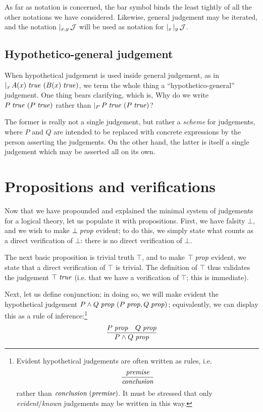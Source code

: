 \documentclass[main.tex]{subfiles}
\begin{document}
As far as notation is concerned, the bar symbol binds the least
tightly of all the other notations we have considered. Likewise,
general judgement may be iterated, and the notation
$\lvert_{x,y}\,\mathcal{J}$ will be used as notation for
$\lvert_{x}\,\lvert_{y}\,\mathcal{J}$.

\subsection{Hypothetico-general judgement}

When hypothetical judgement is used inside general judgement, as in
$\lvert_{x}\,A(x)\;\mathit{true}\ (B(x)\;\mathit{true})$, we term the whole
thing a ``hypothetico-general'' judgement. One thing bears clarifying,
which is, Why do we write $P\;\mathit{true}\ (P\;\mathit{true})$ rather than
$\lvert_{P}\,P\;\mathit{true}\ (P\;\mathit{true})$?

The former is really not a single judgement, but rather a \emph{scheme} for
judgements, where $P$ and $Q$ are intended to be replaced with concrete
expressions by the person asserting the judgements. On the other hand, the
latter is itself a single judgement which may be asserted all on its own.

\section{Propositions and verifications}
Now that we have propounded and explained the minimal system of judgements for
a logical theory, let us populate it with propositions. First, we have falsity
$\bot$, and we wish to make $\bot\;\mathit{prop}$ evident; to do this, we simply state
what counts as a direct verification of $\bot$: there is no
direct verification of $\bot$.

The next basic proposition is trivial truth $\top$, and to make
$\top\;\mathit{prop}$ evident, we state that a direct verification of $\top$
is trivial. The definition of $\top$ thus validates the judgement
$\top\;\mathit{true}$ (i.e. that we have a verification of $\top$; this
is immediate).

Next, let us define conjunction; in doing so, we will make evident the
hypothetical judgement $P\land Q\;\mathit{prop}\ (P\;\mathit{prop},Q\;\mathit{prop})$;
equivalently, we can display this as a rule of inference:\footnote{
Evident hypothetical judgements are often written as rules, i.e.
\[
  \infer{\textit{conclusion}}{\textit{premise}} 
\]
rather than $\textit{conclusion}\ (\textit{premise})$. It must be
stressed that only \emph{evident}/\emph{known} judgements may be
written in this way.
}
\[
  \infer{
    \isprop{P\land Q}
  }{
    \isprop{P} &
    \isprop{Q}
  }
\]
\end{document}
